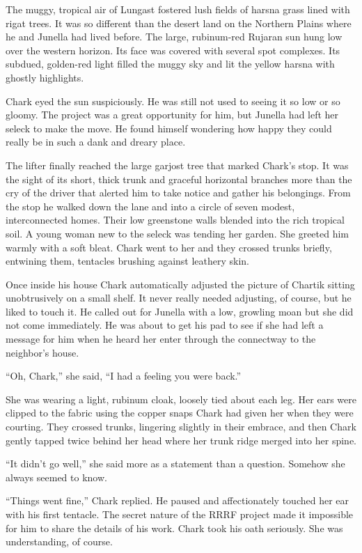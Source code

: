 The muggy, tropical air of Lungast fostered lush fields of harsna grass lined with rigat trees.
It was so different than the desert land on the Northern Plains where he and Junella had lived
before. The large, rubinum-red Rujaran sun hung low over the western horizon. Its face was
covered with several spot complexes. Its subdued, golden-red light filled the muggy sky and lit
the yellow harsna with ghostly highlights.

Chark eyed the sun suspiciously. He was still not used to seeing it so low or so gloomy. The
project was a great opportunity for him, but Junella had left her seleck to make the move. He
found himself wondering how happy they could really be in such a dank and dreary place.

The lifter finally reached the large garjost tree that marked Chark's stop. It was the sight of
its short, thick trunk and graceful horizontal branches more than the cry of the driver that
alerted him to take notice and gather his belongings. From the stop he walked down the lane and
into a circle of seven modest, interconnected homes. Their low greenstone walls blended into the
rich tropical soil. A young woman new to the seleck was tending her garden. She greeted him
warmly with a soft bleat. Chark went to her and they crossed trunks briefly, entwining them,
tentacles brushing against leathery skin.

Once inside his house Chark automatically adjusted the picture of Chartik sitting unobtrusively
on a small shelf. It never really needed adjusting, of course, but he liked to touch it. He
called out for Junella with a low, growling moan but she did not come immediately. He was about
to get his pad to see if she had left a message for him when he heard her enter through the
connectway to the neighbor's house.

``Oh, Chark,'' she said, ``I had a feeling you were back.''

She was wearing a light, rubinum cloak, loosely tied about each leg. Her ears were clipped to
the fabric using the copper snaps Chark had given her when they were courting. They crossed
trunks, lingering slightly in their embrace, and then Chark gently tapped twice behind her head
where her trunk ridge merged into her spine.

``It didn't go well,'' she said more as a statement than a question. Somehow she always seemed
to know.

``Things went fine,'' Chark replied. He paused and affectionately touched her ear with his first
tentacle. The secret nature of the RRRF project made it impossible for him to share the details
of his work. Chark took his oath seriously. She was understanding, of course.


